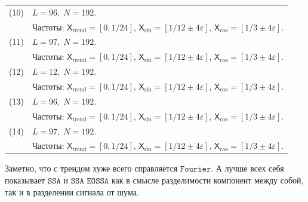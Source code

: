 \documentclass[12pt, specialist, subf
]{disser}
\theoremstyle{definition}
\newcommand{\SSA}{\texttt{SSA}}
\newcommand{\EOSSA}{\texttt{SSA EOSSA}}
\newcommand{\CISSA}{\texttt{CiSSA}}
\newcommand{\FOURIER}{\texttt{Fourier}}
\newcommand{\TS}{\mathsf{X}}
\begin{document}
\begin{table}[H]
\begin{tabularx}{\textwidth}{|c|X|}
    \hline
    (10) & \(L = 96,\; N = 192\). \\
         & Частоты: \(\TS_{\text{trend}} = [0,1/24]\), \(\TS_{\sin} = [1/12\pm4\varepsilon]\), \(\TS_{\cos} = [1/3\pm4\varepsilon]\). \\
    \hline
    (11) & \(L = 97,\; N = 192\). \\
         & Частоты: \(\TS_{\text{trend}} = [0,1/24]\), \(\TS_{\sin} = [1/12\pm4\varepsilon]\), \(\TS_{\cos} = [1/3\pm4\varepsilon]\). \\
    \hline
    (12) & \(L = 12,\; N = 192\). \\
         & Частоты: \(\TS_{\text{trend}} = [0,1/24]\), \(\TS_{\sin} = [1/12\pm4\varepsilon]\), \(\TS_{\cos} = [1/3\pm4\varepsilon]\). \\
    \hline
    (13) & \(L = 96,\; N = 192\). \\
         & Частоты: \(\TS_{\text{trend}} = [0,1/24]\), \(\TS_{\sin} = [1/12\pm4\varepsilon]\), \(\TS_{\cos} = [1/3\pm4\varepsilon]\). \\
    \hline
    (14) & \(L = 97,\; N = 192\). \\
         & Частоты: \(\TS_{\text{trend}} = [0,1/24]\), \(\TS_{\sin} = [1/12\pm4\varepsilon]\), \(\TS_{\cos} = [1/3\pm4\varepsilon]\). \\
    \hline
  \end{tabularx}
\end{table}


Заметно, что с трендом хуже всего справляется $\FOURIER$. А лучше всех себя показывает $\SSA$ и $\EOSSA$ как в смысле разделимости компонент между собой, так и в разделении сигнала от шума.





\end{document}
